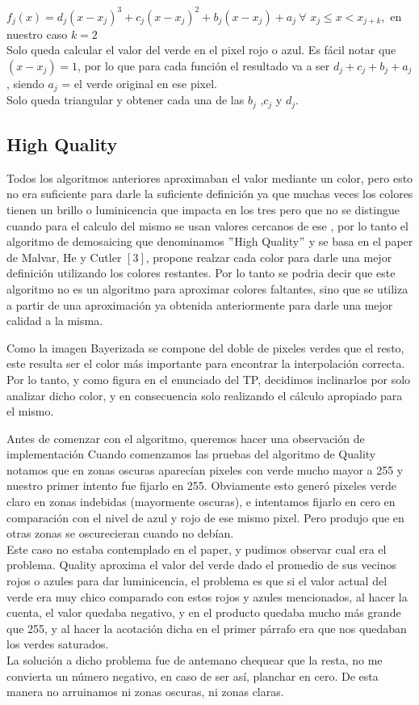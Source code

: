 $f_j(x) = d_j(x-x_j)^3 + c_j(x-x_j)^2 + b_j(x-x_j) + a_j\ \forall$ $x_j \leq x < x_{j+k}$,\ en nuestro caso $k = 2$ \\

Solo queda calcular el valor del verde en el pixel rojo o azul.
Es fácil notar que $(x-x_j) = 1$, por lo que para cada función el resultado va a ser $d_j+c_j+b_j+a_j$, siendo $a_j$ = el verde original en ese pixel.\\
Solo queda triangular y obtener cada una de las $b_j$ ,$c_j$ y $d_j$.

\subsection{High Quality}

Todos los algoritmos anteriores aproximaban el valor mediante un color, pero esto no era suficiente para darle la suficiente definición ya que muchas veces los colores tienen un brillo o luminicencia que impacta en los tres pero que no se distingue cuando para el calculo del mismo se usan valores cercanos de ese , por lo tanto el algoritmo de demosaicing que denominamos $"$High Quality$"
$ y se basa en el paper de Malvar, He y Cutler $[3]$, propone realzar cada color para darle una mejor definición utilizando los colores restantes. Por lo tanto se podria decir que este algoritmo no es un algoritmo para aproximar colores faltantes, sino que se utiliza a partir de una aproximación ya obtenida anteriormente para darle una mejor calidad a la misma.

Como la imagen Bayerizada se compone del doble de pixeles verdes que el resto, este resulta ser el color más importante para encontrar la interpolación correcta. Por lo tanto, y como figura en el enunciado del TP, decidimos inclinarlos por solo analizar dicho color, y en consecuencia solo realizando el cálculo apropiado para el mismo.

Antes de comenzar con el algoritmo, queremos hacer una observación de implementación
Cuando comenzamos las pruebas del algoritmo de Quality notamos que en zonas oscuras aparecían pixeles con verde mucho mayor a 255 y nuestro primer intento fue fijarlo en 255. Obviamente esto generó pixeles verde claro en zonas indebidas (mayormente oscuras), e intentamos fijarlo en cero en comparación con el nivel de azul y rojo de ese mismo pixel. Pero produjo que en otras zonas se oscurecieran cuando no debían.\\
Este caso no estaba contemplado en el paper, y pudimos observar cual era el problema. Quality aproxima el valor del verde dado el promedio de sus vecinos rojos o azules para dar luminicencia, el problema es que si el valor actual del verde era muy chico comparado con estos rojos y azules mencionados, al hacer la cuenta, el valor quedaba negativo, y en el producto quedaba mucho más grande que 255, y al hacer la acotación dicha en el primer párrafo era que nos quedaban los verdes saturados.\\
La solución a dicho problema fue de antemano chequear que la resta, no me convierta un número negativo, en caso de ser así, planchar en cero. De esta manera no arruinamos ni zonas oscuras, ni zonas claras.

